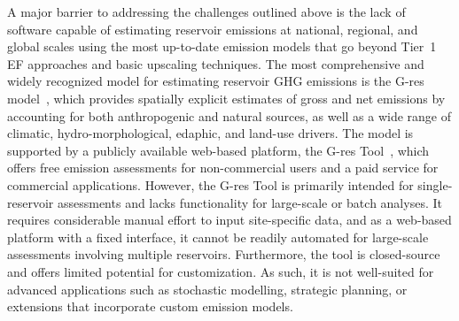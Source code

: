 \documentclass[final,1p,times]{elsarticle}
\begin{document}
A major barrier to addressing the challenges outlined above is the lack of software capable of estimating reservoir emissions at national, regional, and global scales using the most up-to-date emission models that go beyond Tier~1 \acf{EF} approaches and basic upscaling techniques.
The most comprehensive and widely recognized model for estimating reservoir \ac{GHG} emissions is the G-res model~\cite{Prairie2017b, Prairie2021}, which provides spatially explicit estimates of gross and net emissions by accounting for both anthropogenic and natural sources, as well as a wide range of climatic, hydro-morphological, edaphic, and land-use drivers.
The model is supported by a publicly available web-based platform, the G-res Tool~\cite{prairie2017gres}, which offers free emission assessments for non-commercial users and a paid service for commercial applications.
However, the G-res Tool is primarily intended for single-reservoir assessments and lacks functionality for large-scale or batch analyses.
It requires considerable manual effort to input site-specific data, and as a web-based platform with a fixed interface, it cannot be readily automated for large-scale assessments involving multiple reservoirs.
Furthermore, the tool is closed-source and offers limited potential for customization.
As such, it is not well-suited for advanced applications such as stochastic modelling, strategic planning, or extensions that incorporate custom emission models.


\end{document}
